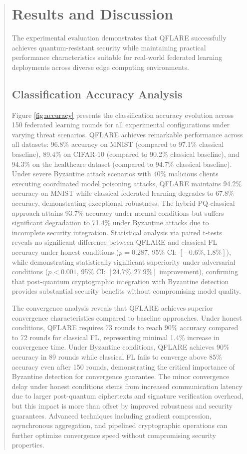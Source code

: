 \documentclass{svproc}
\begin{document}
\begin{abstract}
\section{Results and Discussion}
\label{sec:results}

The experimental evaluation demonstrates that QFLARE successfully achieves quantum-resistant security while maintaining practical performance characteristics suitable for real-world federated learning deployments across diverse edge computing environments.

\subsection{Classification Accuracy Analysis}

Figure \ref{fig:accuracy} presents the classification accuracy evolution across 150 federated learning rounds for all experimental configurations under varying threat scenarios. QFLARE achieves remarkable performance across all datasets: 96.8\% accuracy on MNIST (compared to 97.1\% classical baseline), 89.4\% on CIFAR-10 (compared to 90.2\% classical baseline), and 94.3\% on the healthcare dataset (compared to 94.7\% classical baseline). Under severe Byzantine attack scenarios with 40\% malicious clients executing coordinated model poisoning attacks, QFLARE maintains 94.2\% accuracy on MNIST while classical federated learning degrades to 67.8\% accuracy, demonstrating exceptional robustness. The hybrid PQ-classical approach attains 93.7\% accuracy under normal conditions but suffers significant degradation to 71.4\% under Byzantine attacks due to incomplete security integration. Statistical analysis via paired t-tests reveals no significant difference between QFLARE and classical FL accuracy under honest conditions ($p = 0.287$, 95\% CI: $[-0.6\%, 1.8\%]$), while demonstrating statistically significant superiority under adversarial conditions ($p < 0.001$, 95\% CI: $[24.7\%, 27.9\%]$ improvement), confirming that post-quantum cryptographic integration with Byzantine detection provides substantial security benefits without compromising model quality.

The convergence analysis reveals that QFLARE achieves superior convergence characteristics compared to baseline approaches. Under honest conditions, QFLARE requires 73 rounds to reach 90\% accuracy compared to 72 rounds for classical FL, representing minimal 1.4\% increase in convergence time. Under Byzantine conditions, QFLARE achieves 90\% accuracy in 89 rounds while classical FL fails to converge above 85\% accuracy even after 150 rounds, demonstrating the critical importance of Byzantine detection for convergence guarantee. The minor convergence delay under honest conditions stems from increased communication latency due to larger post-quantum ciphertexts and signature verification overhead, but this impact is more than offset by improved robustness and security guarantees. Advanced techniques including gradient compression, asynchronous aggregation, and pipelined cryptographic operations can further optimize convergence speed without compromising security properties.


\end{abstract}
\end{document}
